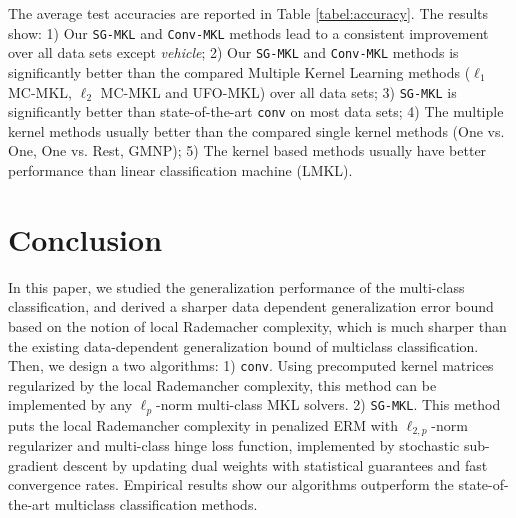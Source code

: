 \documentclass{article}
\begin{document}
The average test accuracies are reported in Table \ref{tabel:accuracy}.
The results show: 1) Our \texttt{SG-MKL} and \texttt{Conv-MKL} methods lead to a consistent improvement over all data sets except \textit{vehicle};
2) Our \texttt{SG-MKL} and \texttt{Conv-MKL} methods is significantly
better than the compared Multiple Kernel Learning methods ($\ell_1$ MC-MKL,
$\ell_2$ MC-MKL and UFO-MKL) over all data sets;
3) \texttt{SG-MKL}  is significantly better than state-of-the-art \texttt{conv} on most data sets;
4) The multiple kernel methods usually better than the compared single kernel methods (One vs. One, One vs. Rest, GMNP);
5) The kernel based methods usually have better performance than linear classification machine (LMKL).

\section{Conclusion}
In this paper, we studied the generalization performance of the multi-class classification,
and derived a sharper data dependent generalization error bound based on the notion of local Rademacher complexity,
which is much sharper than the existing data-dependent generalization bound of multiclass classification.
Then, we design a two algorithms: 1) \texttt{conv}.
Using precomputed kernel matrices regularized by the local Rademancher complexity,
this method can be implemented by any $\ell_p$-norm multi-class MKL solvers.
2) \texttt{SG-MKL}. This method puts the local Rademancher complexity
in penalized ERM with $\ell_{2,p}$-norm regularizer and multi-class hinge loss function,
implemented by stochastic sub-gradient descent by updating
dual weights with statistical guarantees and fast convergence rates.
Empirical results show our algorithms outperform the state-of-the-art multiclass classification methods.


\end{document}
